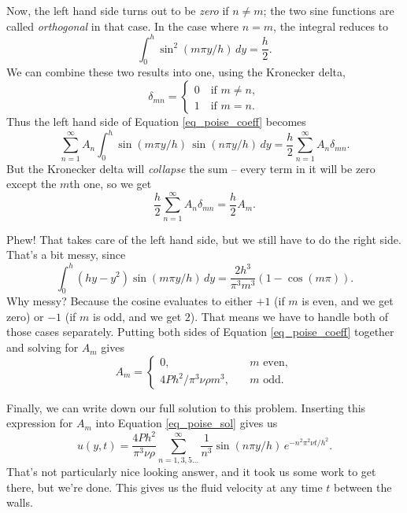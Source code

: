 Now, the left hand side turns out to be \emph{zero} if $n \neq m$; the two sine functions are called \emph{orthogonal} in that case.  In the case where $n=m$, the integral reduces to
\[
\int_0^h \sin^2(m \pi y / h) \, dy = \frac{h}{2}.
\]
We can combine these two results into one, using the Kronecker delta,
\begin{equation}
\delta_{mn} = \begin{cases} 0 \quad \text{if } m \neq n, \\ 1 \quad \text{if } m = n. \end{cases}
\end{equation}
Thus the left hand side of Equation \ref{eq_poise_coeff} becomes
\[
\sum_{n=1}^\infty A_n \int_0^h \sin(m\pi y/h) \, \sin(n \pi y / h) \, dy = \frac{h}{2} \sum_{n=1}^\infty A_n  \delta_{mn}.
\]
But the Kronecker delta will \emph{collapse} the sum -- every term in it will be zero except the $m$th one, so we get
\[
\frac{h}{2} \sum_{n=1}^\infty A_n  \delta_{mn} = \frac{h}{2} A_m.
\]

Phew!  That takes care of the left hand side, but we still have to do the right side.  That's a bit messy, since 
\[
\int_0^h (hy - y^2) \sin(m\pi y / h)\, dy = \frac{2h^3}{\pi^3 m^3} \left( 1 - \cos(m\pi) \right).
\]
Why messy?  Because the cosine evaluates to either $+1$ (if $m$ is even, and we get zero) or $-1$ (if $m$ is odd, and we get $2$).  That means we have to handle both of those cases separately.  Putting both sides of Equation \ref{eq_poise_coeff} together and solving for $A_m$ gives
\begin{equation}
A_m = \begin{cases}
       0, \quad & m \text{ even}, \\
       {4Ph^2}/{\pi^3 \nu \rho m^3}, \quad & m \text{ odd}.
\end{cases}
\end{equation}

Finally, we can write down our full solution to this problem.  Inserting this expression for $A_m$ into Equation \ref{eq_poise_sol} gives us
\begin{equation}
\label{eq_poise_time_sol}
u(y, t) = \frac{4Ph^2}{\pi^3 \nu \rho} \sum_{n=1, 3, 5 \dots}^\infty \frac{1}{n^3} \sin(n \pi y / h) \, e^{-n^2 \pi^2 \nu t / h^2}.
\end{equation}
That's not particularly nice looking answer, and it took us some work to get there, but we're done.  This gives us the fluid velocity at any time $t$ between the walls.


